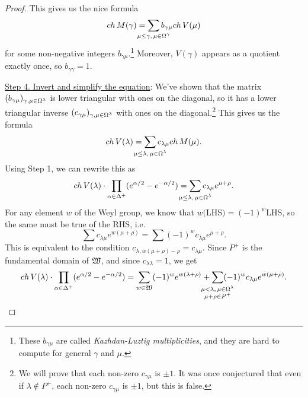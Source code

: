 \begin{proof}
  This gives us the nice formula
  \[
    ch\, M(\gamma) = \sum_{\makebox[0pt]{$\scriptstyle \mu\le \gamma,\, \mu\in
    \W^\gamma$}} b_{\gamma\mu}  ch\, V(\mu)
  \]
  for some non-negative integers $b_{\gamma\mu}$.\footnote{These $b_{\gamma\mu}$ are
  called \emph{Kazhdan-Luztig multiplicities},
  and they are hard to compute for general $\gamma$ and $\mu$.} Moreover, $V(\gamma)$
  appears as a quotient exactly once, so $b_{\gamma\gamma}=1$.

  \underline{Step 4. Invert and simplify the equation}: We've shown that the matrix
  $(b_{\gamma\mu})_{\gamma,\mu\in \Omega^\lambda}$ is lower triangular with ones on the
  diagonal, so it has a lower triangular inverse $(c_{\gamma\mu})_{\gamma,\mu\in
  \Omega^\lambda}$ with ones on the diagonal.\footnote{We will prove that each non-zero
  $c_{\gamma\mu}$ is $\pm 1$. It was once conjectured that even if $\lambda\not\in
  P^+$, each non-zero $c_{\gamma\mu}$ is $\pm 1$, but this is false.} This gives us the
  formula
  \[
    ch\, V(\lambda) = \sum_{\makebox[0pt]{$\scriptstyle \mu\le \lambda,\, \mu\in
    \W^\lambda$}} c_{\lambda\mu} ch\, M(\mu).
  \]
  Using Step 1, we can rewrite this as
  \[
    ch\,V(\lambda) \cdot \prod_{\alpha\in \Delta^+}(e^{\alpha/2}-e^{-\alpha/2}) =
    \sum_{\makebox[0pt]{$\scriptstyle \mu\le \lambda,\, \mu\in \W^\lambda$}} c_{\lambda\mu}e^{\mu+\rho}.
  \]
  For any element $w$ of the Weyl group, we know that $w($LHS$)=(-1)^w$LHS, so the
  same must be true of the RHS, i.e.
  \[
    \sum c_{\lambda\mu} e^{w(\mu+\rho)} = \sum (-1)^w c_{\lambda\mu} e^{\mu+\rho}.
  \]
  This is equivalent to the condition $c_{\lambda, w(\mu+\rho)-\rho}=c_{\lambda\mu}$.
  Since $P^+$ is the fundamental domain of $\mathfrak{W}$, and since $c_{\lambda\lambda}=1$,
  we get
  \[
    ch\,V(\lambda) \cdot \prod_{\alpha\in \Delta^+}(e^{\alpha/2}-e^{-\alpha/2}) =
        \sum_{w\in \weyl}(-1)^w e^{w(\lambda+\rho)} +
        \sum_{\makebox[0pt]{$\substack{\mu< \lambda,\, \mu\in \W^\lambda\\ \mu+\rho
        \in P^+}$}} (-1)^w c_{\lambda\mu} e^{w(\mu+\rho)}.
  \]


\end{proof}
